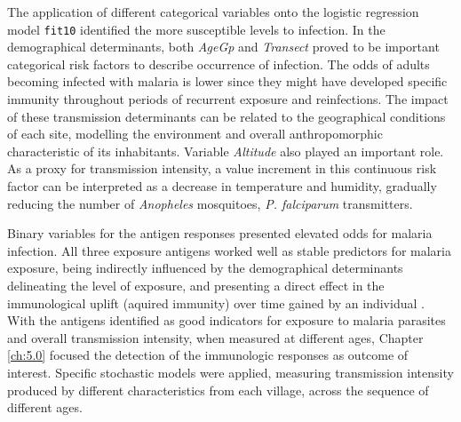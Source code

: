 The application of different categorical variables onto the logistic regression model \texttt{fit10} identified the more susceptible levels to infection.
In the demographical determinants, both \textit{AgeGp} and \textit{Transect} proved to be important categorical risk factors to describe occurrence of infection.
The odds of adults becoming infected with malaria is lower since they might have developed specific immunity throughout periods of recurrent exposure and reinfections.
The impact of these transmission determinants can be related to the geographical conditions of each site, modelling the environment and overall anthropomorphic characteristic of its inhabitants.
Variable \textit{Altitude} also played an important role.
As a proxy for transmission intensity, a value increment in this continuous risk factor can be interpreted as a decrease in temperature and humidity, gradually reducing the number of \textit{Anopheles} mosquitoes, \textit{P. falciparum} transmitters.

Binary variables for the antigen responses presented elevated odds for malaria infection.
All three exposure antigens worked well as stable predictors for malaria exposure, being indirectly influenced by the demographical determinants delineating the level of exposure, and presenting a direct effect in the immunological uplift (aquired immunity) over time gained by an individual \cite{shelton2015genetic}.
With the antigens identified as good indicators for exposure to malaria parasites and overall transmission intensity, when measured at different ages, Chapter \ref{ch:5.0} focused the detection of the immunologic responses as outcome of interest.
Specific stochastic models were applied, measuring transmission intensity produced by different characteristics from each village, across the sequence of different ages.
